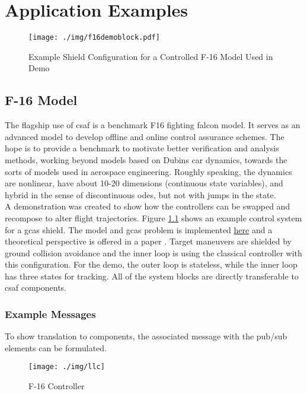 \chapter{Application Examples}

\begin{figure}[h]
\centering
\texttt{[image: ./img/f16demoblock.pdf]}
\caption{Example Shield Configuration for a Controlled F-16 Model Used in Demo}
\label{fig:f16demoblock}
\end{figure}

\section{F-16 Model}

The flagship use of \acrshort{csaf} is a benchmark F16 fighting falcon model. It serves as an advanced model to develop 
offline and online control assurance schemes. The hope is to provide a benchmark to motivate better 
verification and analysis methods, working beyond models based on Dubins car dynamics, towards the sorts of 
models used in aerospace engineering. Roughly speaking, the dynamics are nonlinear, have about 10-20 
dimensions (continuous state variables), and hybrid in the sense of discontinuous \acrshort{ode}s, but not with jumps in 
the state. \\

A demonstration was created to show how the controllers can be swapped and recompose to alter flight 
trajectories. Figure \ref{fig:f16demoblock} shows an example control system for a \acrlong{gcas} shield. The 
model and \acrshort{gcas} problem is implemented \href{https://github.com/stanleybak/AeroBenchVVPython}
{here} and a theoretical perspective is offered in a paper \cite{heidlauf2018verification}. Target maneuvers are shielded by ground collision avoidance and the inner loop is using the classical controller with this configuration. For the demo, the outer loop is stateless, while the inner loop has three states for tracking. All of the system blocks are directly transferable to \acrshort{csaf} components.

\subsection{Example Messages}

To show translation to components, the associated message with the pub/sub elements can be formulated. 

\begin{figure}[h]
\centering
\texttt{[image: ./img/llc]}
\caption{F-16 Controller}
\label{fig:f16plant}
\end{figure}

